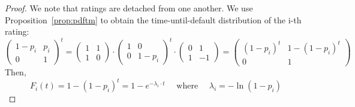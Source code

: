 \documentclass[11pt,fleqn]{book} %
\begin{document}
\begin{proof}
	We note that ratings are detached from one another. We use 
	Proposition~\ref{prop:pdftm} to obtain the time-until-default distribution 
	of the i-th rating:
	\small
	\begin{displaymath}
		\left(
		\begin{array}{cc}
			1-p_i & p_i \\
			0 & 1
		\end{array}
		\right) ^ t 
		= 
		\left(
		\begin{array}{cc}
			1 & 1 \\
			1 & 0
		\end{array}
		\right) 
		\cdot
		\left(
		\begin{array}{cc}
			1 & 0 \\
			0 & 1-p_i
		\end{array}
		\right) ^t 
		\cdot
		\left(
		\begin{array}{cc}
			0 & 1 \\
			1 & -1
		\end{array}
		\right)
		=
		\left(
		\begin{array}{cc}
			(1-p_i)^t & 1-(1-p_i)^t \\
			0 & 1
		\end{array}
		\right)
	\end{displaymath}
	Then,
	\begin{displaymath}
		F_i(t) = 1-(1-p_i)^t = 1 - e^{-\lambda_i \cdot t} \quad \text{ where } \quad \lambda_i = -\ln(1-p_i)
	\end{displaymath}
\end{proof}
\end{document}
